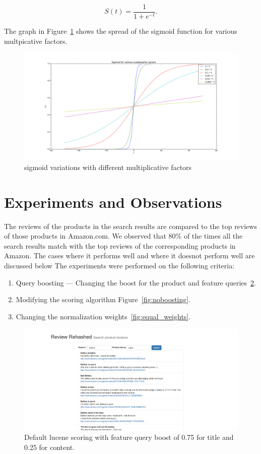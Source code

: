 \documentclass{article}
\begin{document}
\begin{equation}
S(t) = \frac{1}{1 + e^{-t}}.
\end{equation}

The graph in Figure~\ref{fig:sigmoid} shows the spread of the sigmoid function for various multpicative factors.
\begin{figure}[ht!]
  \centering
  \includegraphics[width=1\textwidth]{sigmoidVariations}
  \caption{sigmoid variations with different multiplicative factors\label{fig:sigmoid}}
\end{figure}

\section{Experiments and Observations}
The reviews of the products in the search results are compared to the top reviews of those products in Amazon.com. We observed that 80\% of the times all the search results match with the top reviews of the corresponding products in Amazon. The cases where it performs well and where it doesnot perform well are discussed below
The experiments were performed on the following criteria:
\begin{enumerate}
  \item Query boosting --- Changing the boost for the product and feature queries~\ref{fig:noscoring}.
  \item Modifying the scoring algorithm Figure~\ref{fig:noboosting}.
  \item Changing the normalization weights~\ref{fig:equal_weights}.
\end{enumerate}

\begin{figure}[ht!]
  \centering
  \includegraphics[width=1\textwidth]{noscoring}
  \caption{Default lucene scoring with feature query boost of 0.75 for title and 0.25 for content.~\label{fig:noscoring}}
\end{figure}
\end{document}
